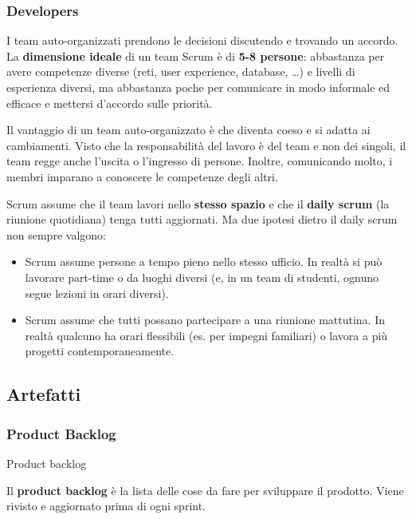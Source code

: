 \subsubsection{Developers}\label{developers}

I team auto-organizzati prendono le decisioni discutendo e trovando un
accordo. La \textbf{dimensione ideale} di un team Scrum è di \textbf{5-8
persone}: abbastanza per avere competenze diverse (reti, user
experience, database, \ldots) e livelli di esperienza diversi, ma
abbastanza poche per comunicare in modo informale ed efficace e mettersi
d'accordo sulle priorità.

Il vantaggio di un team auto-organizzato è che diventa coeso e si adatta
ai cambiamenti. Visto che la responsabilità del lavoro è del team e non
dei singoli, il team regge anche l'uscita o l'ingresso di persone.
Inoltre, comunicando molto, i membri imparano a conoscere le competenze
degli altri.

Scrum assume che il team lavori nello \textbf{stesso spazio} e che il
\textbf{daily scrum} (la riunione quotidiana) tenga tutti aggiornati. Ma
due ipotesi dietro il daily scrum non sempre valgono:

\begin{itemize}
\tightlist
\item
  Scrum assume persone a tempo pieno nello stesso ufficio. In realtà si
  può lavorare part-time o da luoghi diversi (e, in un team di studenti,
  ognuno segue lezioni in orari diversi).
\item
  Scrum assume che tutti possano partecipare a una riunione mattutina.
  In realtà qualcuno ha orari flessibili (es. per impegni familiari) o
  lavora a più progetti contemporaneamente.
\end{itemize}

\subsection{Artefatti}\label{artefatti}

\subsubsection{Product Backlog}\label{product-backlog}

\begin{boxdefinition}{Product backlog}

Il \textbf{product backlog} è la lista delle cose da fare per sviluppare
il prodotto. Viene rivisto e aggiornato prima di ogni sprint.

\end{boxdefinition}


